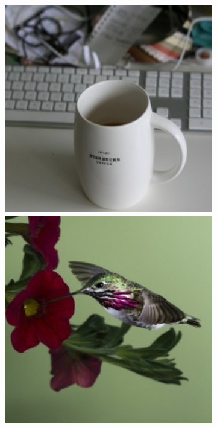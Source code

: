 \begin{figure}[t]
\begin{subfigure}[b]{0.19\textwidth}
        \includegraphics[width=1\textwidth]{figures/qualitative_results/ILSVRC2012_val_00016576_resize.JPEG}
        \includegraphics[width=1\textwidth]{figures/qualitative_results/ILSVRC2012_val_00005779_resize.JPEG}

\end{subfigure}
\end{figure}
